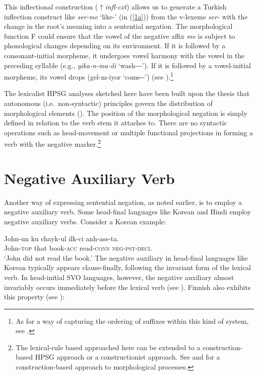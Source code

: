 \documentclass[output=paper
                ,modfonts
		,nonflat
	        ,collection
	        ,collectionchapter
	        ,collectiontoclongg
 	        ,biblatex  
                ,babelshorthands
                ,newtxmath
                ,draftmode
                ,colorlinks, citecolor=brown 
]{./langsci/langscibook}
\begin{document}
{\begin{exe}
\begin{xlist}
\begin{exe}
\begin{xlist}
{This inflectional construction ($\uparrow$\emph{infl-cxt}) allows us to generate a Turkish inflection construct like \textit{ser-me} `like-\NEG' (in (\ref{1a})) from the v-lexeme \textit{ser-} with the change in the root's meaning into a sentential negation. The morphological function F could ensure that the vowel of the negative affix \textit{me} is subject to phonological changes depending on its environment. If it is followed by a consonant-initial morpheme, it undergoes vowel harmony with the vowel in the preceding syllable (e.g., \textit{yika-n-ma-di} `wash-\REFL-\NEG-\PST'). If it is followed by a vowel-initial morpheme, its vowel drops (gel-m-iyor `come-\NEG-\PROG') (see \citep{kelepir}).\footnote{As
 for a way of capturing the ordering of suffixes within this kind of system,
 see \citep{Kim:16}.}
}\fi

The lexicalist HPSG analyses sketched here
 have been built upon the
thesis that autonomous (i.e.\ non-syntactic) principles govern the
distribution of morphological elements (\citep{BM:95}).
The position of the morphological negation is simply
defined in relation to
the verb stem it attaches to. There are no syntactic operations such
as head-movement or multiple functional projections in forming
a verb with the negative marker.\footnote{The lexical-rule based
approached here can be extended to a construction-based HPSG
approach or a constructionist approach. See
\citet{Sag:12} and \citep{Hilpert:16} for a construction-based
approach to morphological processes.}



\section{Negative Auxiliary Verb}

Another way of expressing sentential negation, as noted earlier, is to employ
a negative auxiliary
verb. Some head-final languages like Korean and Hindi employ
negative auxiliary verbs. Consider a Korean example:

\ea
\gll John-un ku chayk-ul ilk-ci anh-ass-ta. \\
     John-\textsc{top} that book-\textsc{acc} read-\textsc{conn} \textsc{neg}-\textsc{pst}-\textsc{decl}  \\
\glt `John did not read the book.'
\z
%
%
\noindent
The negative auxiliary in head-final languages like Korean
typically appears
clause-finally, following the invariant form of the lexical verb.
In head-initial SVO languages, however, the negative auxiliary
almost invariably occurs immediately before the lexical verb
(see \citep{Payne:85}). Finnish also exhibits this property (see \citep{Mitchell:91}):


\end{xlist}
\end{exe}
\end{xlist}
\end{exe}}
\end{document}
